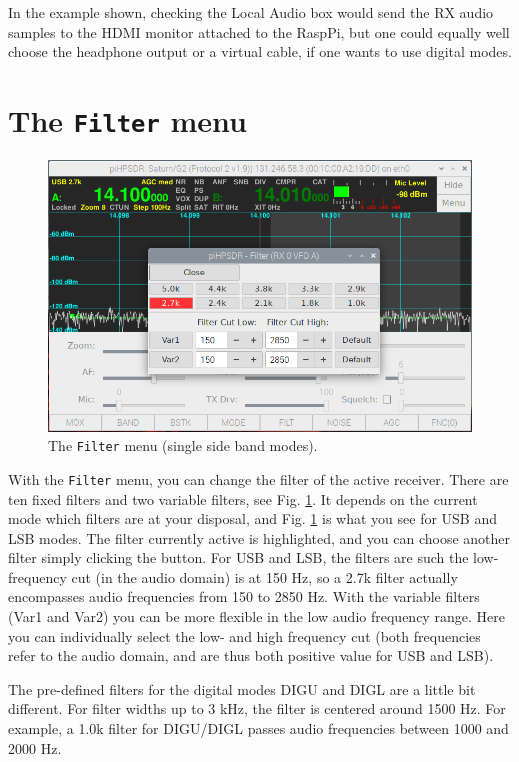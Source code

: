 \documentclass[12pt]{book}
\def\bltt#1{\texttt{\color{blue}#1}}
\begin{document}
In the example shown, checking the Local Audio box would send the RX audio
samples to the HDMI monitor attached to the RaspPi, but one could equally
well choose the headphone output or a virtual cable, if one wants to use
digital modes.

\section{The \texttt{Filter} menu}

\begin{figure}[ht]
\center
\includegraphics[width=12cm]{FilterMenuUSB.png}
\caption{The \bltt{Filter} menu (single side band modes).}
\label{fig:FilterMenuUSB}
\end{figure}

With the \bltt{Filter} menu, you can change the filter of the active receiver. There
are ten fixed filters and two variable filters, see Fig. \ref{fig:FilterMenuUSB}. It
depends on the current mode which filters are at your disposal, and Fig. \ref{fig:FilterMenuUSB}
is what you see for USB and LSB modes. The filter currently active is highlighted, and
you can choose another filter simply clicking the button. For USB and LSB, the filters
are such the low-frequency cut (in the audio domain) is at 150 Hz, so a 2.7k filter
actually encompasses audio frequencies from 150 to 2850 Hz. With the variable filters
(Var1 and Var2) you can be more flexible in the low audio frequency range. Here you
can individually select the low- and high frequency cut (both frequencies refer to
the audio domain, and are thus both positive value for USB and LSB).

The pre-defined filters for the digital modes DIGU and DIGL are a little bit different.
For filter widths up to 3 kHz, the filter is centered around 1500 Hz. For example,
a 1.0k filter for DIGU/DIGL passes audio frequencies between 1000 and 2000 Hz.
\end{document}

